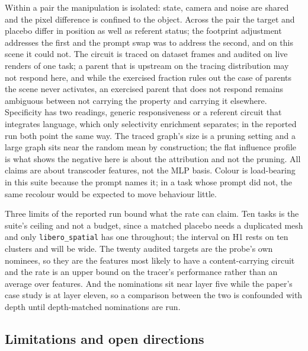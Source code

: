 Within a pair the manipulation is isolated: state, camera and noise are shared
and the pixel difference is confined to the object. Across the pair the target
and placebo differ in position as well as referent status; the footprint
adjustment addresses the first and the prompt swap was to address the second,
and on this scene it could not. The circuit is traced on dataset frames and
audited on live renders of one task; a parent that is upstream on the tracing
distribution may not respond here, and while the exercised fraction rules out
the case of parents the scene never activates, an exercised parent that does
not respond remains ambiguous between not carrying the property and carrying it
elsewhere. Specificity has two readings, generic responsiveness or a referent
circuit that integrates language, which only selectivity enrichment separates;
in the reported run both point the same way. The traced graph's size is a
pruning setting and a large graph sits near the random mean by construction;
the flat influence profile is what shows the negative here is about the
attribution and not the pruning. All claims are about transcoder features, not
the MLP basis. Colour is load-bearing in this suite because the prompt names
it; in a task whose prompt did not, the same recolour would be expected to move
behaviour little.

Three limits of the reported run bound what the rate can claim. Ten tasks is
the suite's ceiling and not a budget, since a matched placebo needs a duplicated
mesh and only \texttt{libero\_spatial} has one throughout; the interval on H1
rests on ten clusters and will be wide. The twenty audited targets are the
probe's own nominees, so they are the features most likely to have a
content-carrying circuit and the rate is an upper bound on the tracer's
performance rather than an average over features. And the nominations sit near
layer five while the paper's case study is at layer eleven, so a comparison
between the two is confounded with depth until depth-matched nominations are
run.

\subsection{Limitations and open directions}
\label{sec:gaps}


